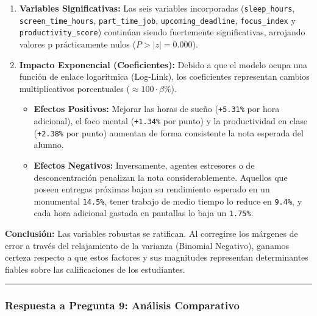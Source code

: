 \documentclass[11pt]{article}
\providecommand{\tightlist}{%
      \setlength{\itemsep}{0pt}\setlength{\parskip}{0pt}}
\begin{document}
\begin{enumerate}
\def\labelenumi{\arabic{enumi}.}
\item
  \textbf{Variables Significativas:} Las seis variables incorporadas
  (\texttt{sleep\_hours}, \texttt{screen\_time\_hours},
  \texttt{part\_time\_job}, \texttt{upcoming\_deadline},
  \texttt{focus\_index} y \texttt{productivity\_score}) continúan siendo
  fuertemente significativas, arrojando valores p prácticamente nulos
  (\(P>|z| = 0.000\)).
\item
  \textbf{Impacto Exponencial (Coeficientes):} Debido a que el modelo
  ocupa una función de enlace logarítmica (Log-Link), los coeficientes
  representan cambios multiplicativos porcentuales
  (\(\approx 100 \cdot \beta \%\)).

  \begin{itemize}
  \tightlist
  \item
    \textbf{Efectos Positivos:} Mejorar las horas de sueño
    (\texttt{+5.31\%} por hora adicional), el foco mental
    (\texttt{+1.34\%} por punto) y la productividad en clase
    (\texttt{+2.38\%} por punto) aumentan de forma consistente la nota
    esperada del alumno.
  \item
    \textbf{Efectos Negativos:} Inversamente, agentes estresores o de
    desconcentración penalizan la nota considerablemente. Aquellos que
    poseen entregas próximas bajan su rendimiento esperado en un
    monumental \texttt{14.5\%}, tener trabajo de medio tiempo lo reduce
    en \texttt{9.4\%}, y cada hora adicional gastada en pantallas lo
    baja un \texttt{1.75\%}.
  \end{itemize}
\end{enumerate}

\textbf{Conclusión:} Las variables robustas se ratifican. Al corregirse
los márgenes de error a través del relajamiento de la varianza (Binomial
Negativo), ganamos certeza respecto a que estos factores y sus
magnitudes representan determinantes fiables sobre las calificaciones de
los estudiantes.

    \begin{center}\rule{0.5\linewidth}{0.5pt}\end{center}

\subsubsection{Respuesta a Pregunta 9: Análisis
Comparativo}\label{respuesta-a-pregunta-9-anuxe1lisis-comparativo}
\end{document}
